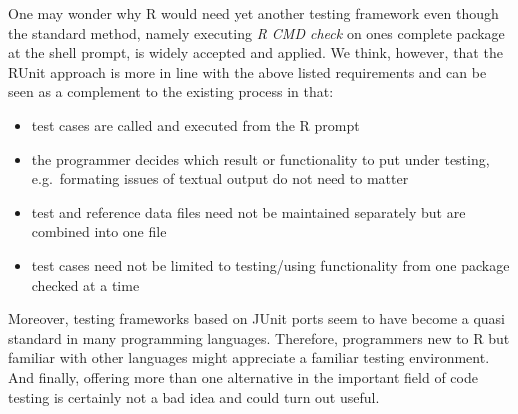 \documentclass[12pt, a4paper]{article}
\begin{document}
One may wonder why R would need yet another testing framework
even though the standard method, namely executing {\it R CMD check} on ones complete package at the shell prompt, is widely accepted and applied.
We think, however, that the RUnit approach is more in line with the above listed
requirements and can be seen as a complement to the existing process in that:
\begin{itemize}
\item{test cases are called and executed from the R prompt}
\item{the programmer decides which result or functionality to put under testing, e.g.\
      formating issues of textual output do not need to matter}
\item{test and reference data files need not be maintained separately but are combined into one file}
\item{test cases need not be limited to testing/using functionality from one package checked at a time}
\end{itemize}
Moreover, testing frameworks based on JUnit ports seem
to have become a quasi standard in many programming languages. Therefore,
programmers new to R but familiar with other languages might
appreciate a familiar testing environment. And finally, offering more
than one alternative in the important field of code testing is certainly not a bad idea and could turn out useful.
\end{document}
